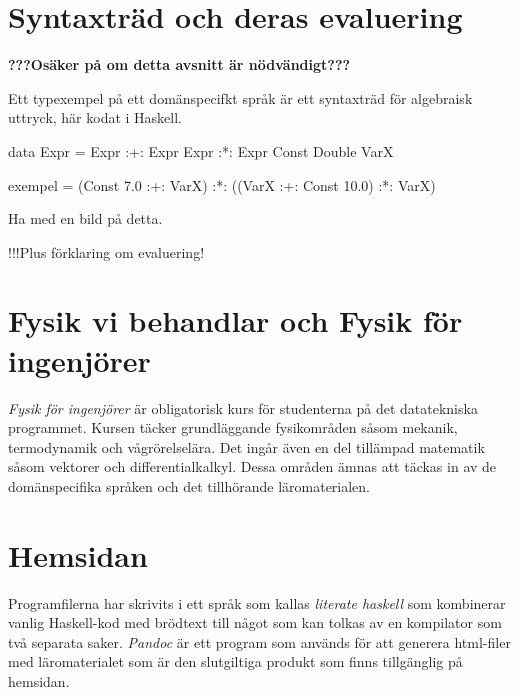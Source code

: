 \section{Syntaxträd och deras evaluering}

\textbf{???Osäker på om detta avsnitt är nödvändigt???}

\begin{binge}

Ett typexempel på ett domänspecifkt språk är ett syntaxträd för algebraisk uttryck, här kodat i Haskell.

    data Expr = Expr :+: Expr
                Expr :*: Expr
                Const Double
                VarX

    exempel = (Const 7.0 :+: VarX) :*: ((VarX :+: Const 10.0) :*: VarX)

Ha med en bild på detta.

!!!Plus förklaring om evaluering!
\end{binge}

\section{Fysik vi behandlar och Fysik för ingenjörer}

\begin{draft}
  \emph{Fysik för ingenjörer} är obligatorisk kurs för studenterna på det
  datatekniska programmet. Kursen täcker grundläggande fysikområden såsom
  mekanik, termodynamik och vågrörelselära. Det ingår även en del tillämpad
  matematik såsom vektorer och differentialkalkyl. Dessa områden ämnas att
  täckas in av de domänspecifika språken och det tillhörande läromaterialen.
\end{draft}

\section{Hemsidan}

\begin{draft}
  Programfilerna har skrivits i ett språk som kallas \textit{literate haskell}
  som kombinerar vanlig Haskell-kod med brödtext till något som kan tolkas av en
  kompilator som två separata saker. \textit{Pandoc} är ett program som används
  för att generera html-filer med läromaterialet som är den slutgiltiga produkt
  som finns tillgänglig på hemsidan.
\end{draft}
